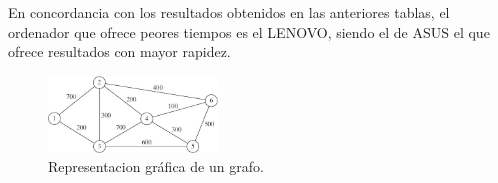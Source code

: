 \documentclass{homework}
\begin{document}
    En concordancia con los resultados obtenidos en las anteriores tablas, el ordenador que ofrece peores
    tiempos es el LENOVO, siendo el de ASUS el que ofrece resultados con mayor rapidez. 

    \begin{figure}[h]
        \centering
        \includegraphics[width=0.4\textwidth]{img/graf-floyd.jpeg}
        \caption{Representacion gráfica de un grafo.}
    \end{figure}

    \begin{center}
        
    \end{center}
    
\end{document}

